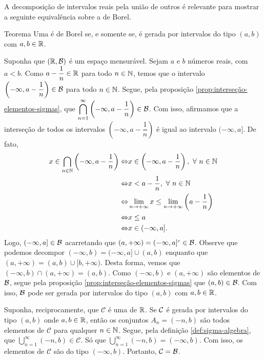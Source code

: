 A decomposição de intervalos reais pela união de outros é relevante para mostrar a seguinte equivalência sobre a \sigal de Borel.\\
\begin{env}{Teorema}
\label{teo:equiv-borel}
    Uma \sigal é de Borel  se, e somente se, é gerada por intervalos do tipo $(a,b)$ com $a,b \in \mathbb{R}$.
    \vspace{-0.2cm}
\end{env}
\begin{prova}
   Suponha que $(\mathbb{R},\operatorname{\mathcal{B}})$ é um espaço mensurável. 
   Sejam $a$ e $b$ números reais, com $a<b$.
   Como $a - \dfrac{1}{n} \in \mathbb{R}$ para todo $n \in \operatorname{\mathbb{N}}$, temos que o intervalo
   $\left(-\infty, a- \dfrac{1}{n}\right) \in \operatorname{\mathcal{B}}$ para todo $n \in \operatorname{\mathbb{N}}$.
   Segue, pela proposição \ref{prop:interseção-elementos-sigmas}, que
   $\displaystyle \bigcap_{n = 1}^\infty \left(-\infty, a- \dfrac{1}{n}\right) \in \operatorname{\mathcal{B}}$.
   Com isso, afirmamos que a interseção de todos os intervalos $\left(-\infty, a - \dfrac{1}{n}\right)$ é igual ao intervalo $(-\infty, a]$.
   De fato,
   \begin{align*}
   		x \in \bigcap_{n \in \operatorname{\mathbb{N}}} \left(-\infty, a - \dfrac{1}{n}\right)
   		\Leftrightarrow & x \in \left(-\infty, a - \dfrac{1}{n}\right), \ \forall \ n \in \operatorname{\mathbb{N}}\\
   		\Leftrightarrow & x < a - \dfrac{1}{n}, \ \forall \ n \in \operatorname{\mathbb{N}}\\
   		\Leftrightarrow & \displaystyle \lim_{n \to +\infty} x \leq \displaystyle \lim_{n \to +\infty} \left(a - \dfrac{1}{n}\right)\\
   		\Leftrightarrow & x \leq a\\
   		\Leftrightarrow & x \in (-\infty, a].
   \end{align*}
	Logo, $(-\infty, a] \in \operatorname{\mathcal{B}}$ acarretando que $(a, +\infty) = (-\infty, a]^c \in \operatorname{\mathcal{B}}$.
	Observe que podemos decompor $(-\infty, b) = (-\infty,a] \cup (a, b)$ enquanto que $(a, +\infty) = (a, b) \cup [b, +\infty)$.
	Desta forma, vemos que $(-\infty, b) \cap (a, +\infty) = (a,b)$. 
	Como $(-\infty, b)$ e $(a, +\infty)$ são elementos de $\operatorname{\mathcal{B}}$, segue pela proposição
	\ref{prop:interseção-elementos-sigmas} que $(a,b) \in \operatorname{\mathcal{B}}$.
	Com isso, $\operatorname{\mathcal{B}}$ pode ser gerada por intervalos do tipo $(a,b)$ com $a,b \in \mathbb{R}$.
   
	Suponha, reciprocamente, que $\mathcal{C}$ é uma \sigal de $\mathbb{R}$.
	Se $\operatorname{\mathcal{C}}$ é gerada por intervalos do tipo $(a,b)$ onde $a,b \in \mathbb{R}$, então
	os conjuntos $A_n = (-n, b)$ são todos elementos de $\mathcal{C}$ para qualquer $n \in \operatorname{\mathbb{N}}$.
	Segue, pela definição \ref{def:sigma-algebra}, que 
	$\displaystyle \bigcup_{n = 1}^\infty (-n,b) \in \mathcal{C}$.
	Só que $\displaystyle \bigcup_{n = 1}^\infty (-n,b) = (-\infty, b)$.
	Com isso, os elementos de $\mathcal{C}$ são do tipo $(-\infty, b)$.
	Portanto, $\mathcal{C} = \operatorname{\mathcal{B}}$.
\end{prova}

